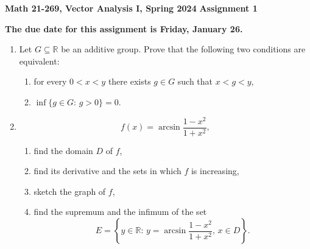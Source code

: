 \documentclass{article}%
\begin{document}
\begin{center}
\textbf{Math 21-269, Vector Analysis I, Spring 2024}
\textbf{Assignment 1}
\end{center}
\textbf{The due date for this assignment is Friday, January 26.}
\begin{enumerate}
\item Let $G\subseteq\mathbb{R}$ be an additive group. Prove that the
following two conditions are equivalent:
\begin{enumerate}
\item for every $0<x<y$ there exists $g\in G$ such that $x<g<y$,
\item $\inf\{g\in G:\,g>0\}=0$.
\end{enumerate}
\item
\[
f\left( x\right) =\arcsin\frac{1-x^{2}}{1+x^{2}},
\]
\begin{enumerate}
\item find the domain $D$ of $f$,
\item find its derivative and the sets in which $f$ is increasing,
\item sketch the graph of $f$,
\item find the supremum and the infimum of the set%
\[
E=\left\{ y\in\mathbb{R}:\,y=\arcsin\frac{1-x^{2}}{1+x^{2}},\,x\in D\right\}
.
\]
\end{enumerate}
\end{enumerate}
\end{document}
